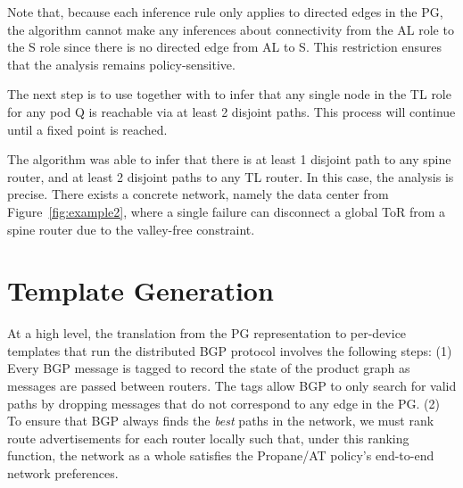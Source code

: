 \documentclass[numbers, 10pt, preprint]{sigplanconf}
\newcommand{\sysname}{{\text{}\small \sf Propane/AT}\xspace}
\newcommand{\KW}[1]{\texttt{\small\bfseries{#1}}}
\begin{document}
Note that, because each inference rule only applies to directed edges in the PG, the algorithm cannot make any inferences about connectivity from the AL role to the S role since there is no directed edge from AL to S. This restriction ensures that the analysis remains policy-sensitive.

The next step is to use  together with  to infer that any single node in the TL role for any pod Q is reachable via at least 2 disjoint paths. This process will continue until a fixed point is reached.

The algorithm was able to infer that there is at least 1 disjoint path to any spine router, and at least 2 disjoint paths to any TL router. In this case, the analysis is precise. There exists a concrete network, namely the data center from Figure~\ref{fig:example2}, where a single failure can disconnect a global ToR from a spine router due to the valley-free constraint.


%
%
%
%

\newcommand{\highlight}[1]{%
  \colorbox{red!50}{$\displaystyle#1$}}
\newcommand{\Router}[1]{\KW{Router} #1:}
\newcommand{\Template}[1]{\KW{Template} #1:}
\newcommand{\REGEX}[1]{\texttt{regex}(#1)}
\newcommand{\PEER}{\texttt{peer}}
\newcommand{\PREFIX}{\texttt{prefix}}
\newcommand{\IF}{\texttt{if}}
\newcommand{\THEN}{\texttt{then}}
\newcommand{\COMM}{\texttt{comm}}
\newcommand{\MED}{\texttt{MED}}
\newcommand{\Arrow}{\ensuremath{\leftarrow}}



\section{Template Generation}
\label{sec:generation}

At a high level, the translation from the PG representation to per-device templates that run the distributed BGP protocol involves the following steps: (1) Every BGP message is tagged to record the state of the product graph as messages are passed between routers. The tags allow BGP to only search for valid paths by dropping messages that do not correspond to any edge in the PG. (2) To ensure that BGP always finds the \emph{best} paths in the network, we must rank route advertisements for each router locally such that, under this ranking function, the network as a whole satisfies the \sysname policy's end-to-end network preferences. 
\end{document}
